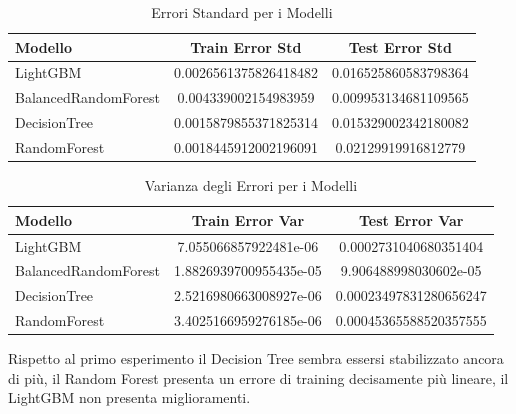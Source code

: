 \begin{table}[H]
    \centering
    \begin{tabular}{lcc}
    \toprule
    \textbf{Modello} & \textbf{Train Error Std} & \textbf{Test Error Std} \\
    \midrule
    LightGBM & 0.0026561375826418482 & 0.016525860583798364 \\
    BalancedRandomForest & 0.004339002154983959 & 0.009953134681109565\\
    DecisionTree & 0.0015879855371825314 & 0.015329002342180082 \\
    RandomForest & 0.0018445912002196091 & 0.02129919916812779 \\
    \bottomrule
    \end{tabular}
    \caption{Errori Standard per i Modelli}
\end{table}


\begin{table}[H]
    \centering
    \begin{tabular}{lcc}
    \toprule
    \textbf{Modello} & \textbf{Train Error Var} & \textbf{Test Error Var} \\
    \midrule
    LightGBM & 7.055066857922481e-06 & 0.0002731040680351404 \\
    BalancedRandomForest & 1.8826939700955435e-05 & 9.906488998030602e-05 \\
    DecisionTree & 2.5216980663008927e-06 & 0.00023497831280656247 \\
    RandomForest & 3.4025166959276185e-06 & 0.00045365588520357555 \\
    \bottomrule
    \end{tabular}
    \caption{Varianza degli Errori per i Modelli}
\end{table}

\noindent Rispetto al primo esperimento il Decision Tree sembra essersi stabilizzato ancora di più, il Random Forest presenta un errore di training decisamente più lineare, il LightGBM non presenta miglioramenti.


